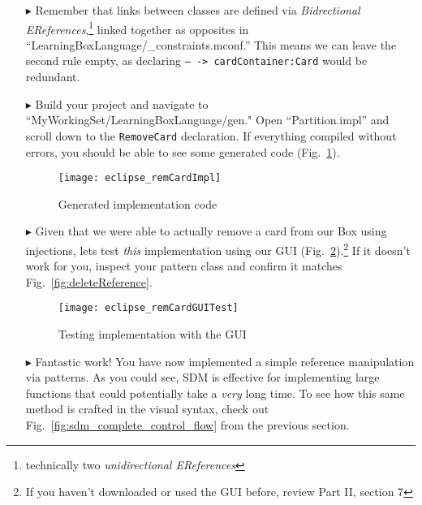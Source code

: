 \begin{itemize}
\item[$\blacktriangleright$] Remember that links between classes are defined via \emph{Bidrectional EReferences},\footnote{technically two
\emph{unidirectional EReferences}} linked together as opposites in ``LearningBoxLanguage/\_con\-straints.mconf.'' This means we can leave the second rule empty,
as declaring \texttt{-- -> cardContainer:Card} would be redundant.

\item[$\blacktriangleright$] Build your project and navigate to ``MyWorkingSet/LearningBoxLanguage/gen." Open ``Partition.impl'' and scroll down to the
\texttt{RemoveCard} declaration. If everything compiled without errors, you should be able to see some generated code (Fig.~\ref{fig:remCardImpl}).

\begin{figure}[htp]
\begin{center}
  \texttt{[image: eclipse\_remCardImpl]}
  \caption{Generated implementation code}
  \label{fig:remCardImpl}
\end{center}
\end{figure}

\item[$\blacktriangleright$] Given that we were able to actually remove a card from our Box using injections, lets test \emph{this} implementation using our GUI
(Fig.~\ref{fig:GUITest}).\footnote{ If you haven't downloaded or used the GUI before, review Part II, section 7} If it doesn't work for you, inspect your
pattern class and confirm it matches Fig.~\ref{fig:deleteReference}.

\begin{figure}[htp]
\begin{center}
  \texttt{[image: eclipse\_remCardGUITest]}
  \caption{Testing implementation with the GUI}
  \label{fig:GUITest}
\end{center}
\end{figure}

\item[$\blacktriangleright$] Fantastic work! You have now implemented a simple reference manipulation via patterns. As you could see, SDM is effective for
implementing large functions that could potentially take a \emph{very} long time. To see how this same method is crafted in the visual syntax, check out
Fig.~\ref{fig:sdm_complete_control_flow} from the previous section.


\end{itemize}
